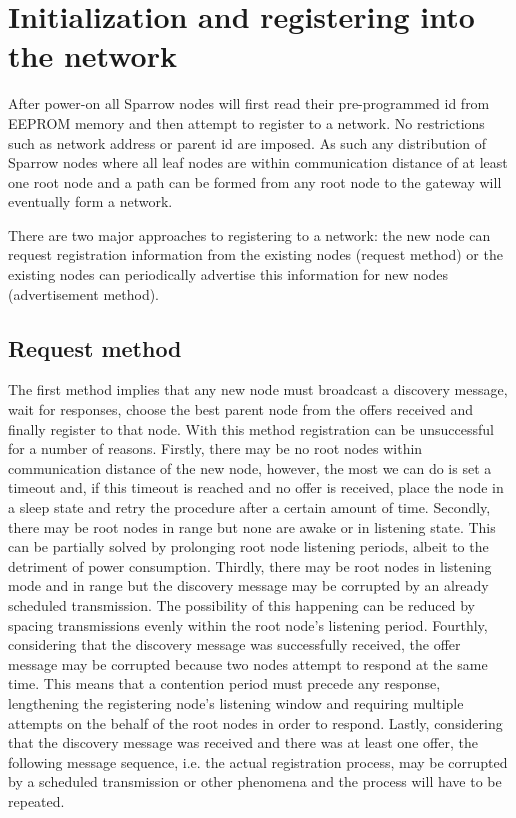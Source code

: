 \section{Initialization and registering into the network}
\label{sec:initialization_and_registering_into_the_network}

After power-on all Sparrow nodes will first read their pre-programmed id from
\mbox{EEPROM} memory and then attempt to register to a network. No restrictions
such as network address or parent id are imposed. As such any distribution of
Sparrow nodes where all leaf nodes are within communication distance of at
least one root node and a path can be formed from any root node to the gateway
will eventually form a network. 

There are two major approaches to registering to a network: the new node can
request registration information from the existing nodes (request method) or
the existing nodes can periodically advertise this information for new nodes
(advertisement method). 

\subsection{Request method}

The first method implies that any new node must broadcast a discovery message,
wait for responses, choose the best parent node from the offers received and
finally register to that node. With this method registration can be
unsuccessful for a number of reasons. Firstly, there may be no root nodes
within communication distance of the new node, however, the most we can do is
set a timeout and, if this timeout is reached and no offer is received, place
the node in a sleep state and retry the procedure after a certain amount of
time. Secondly, there may be root nodes in range but none are awake or in
listening state. This can be partially solved by prolonging root node listening
periods, albeit to the detriment of power consumption. Thirdly, there may be
root nodes in listening mode and in range but the discovery message may be
corrupted by an already scheduled transmission. The possibility of this
happening can be reduced by spacing transmissions evenly within the root node's
listening period. Fourthly, considering that the discovery message was
successfully received, the offer message may be corrupted because two nodes
attempt to respond at the same time. This means that a contention period must
precede any response, lengthening the registering node's listening window and
requiring multiple attempts on the behalf of the root nodes in order to
respond. Lastly, considering that the discovery message was received and there
was at least one offer, the following message sequence, i.e. the actual
registration process, may be corrupted by a scheduled transmission or other
phenomena and the process will have to be repeated.

